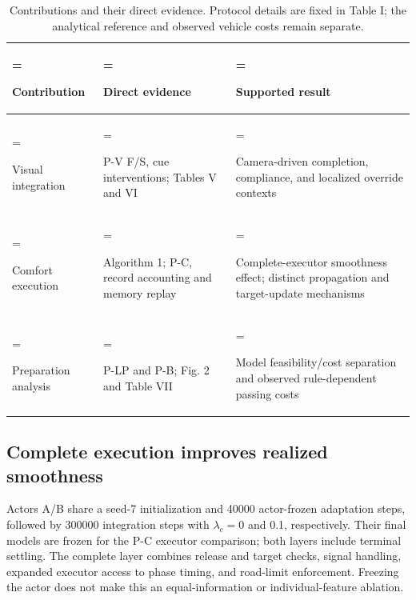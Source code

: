 \documentclass[letterpaper,journal]{IEEEtran}
\begin{document}
\begin{table}[!t]
\centering
\renewcommand{\thetable}{II}
\caption{Contributions and their direct evidence. Protocol details are fixed in Table I; the analytical reference and observed vehicle costs remain separate.}
\setlength{\tabcolsep}{3pt}
\renewcommand{\arraystretch}{1.12}
\begin{tabularx}{\textwidth}{@{}>{\hsize=0.600000\hsize\linewidth=\hsize\raggedright\arraybackslash}X>{\hsize=1.020000\hsize\linewidth=\hsize\raggedright\arraybackslash}X>{\hsize=1.380000\hsize\linewidth=\hsize\raggedright\arraybackslash}X@{}}
\toprule
\textbf{Contribution} & \textbf{Direct evidence} & \textbf{Supported result} \\
\midrule
Visual integration & P-V F/S, cue interventions; Tables V and VI & Camera-driven completion, compliance, and localized override contexts \\
Comfort execution & Algorithm 1; P-C, record accounting and memory replay & Complete-executor smoothness effect; distinct propagation and target-update mechanisms \\
Preparation analysis & P-LP and P-B; Fig. 2 and Table VII & Model feasibility/cost separation and observed rule-dependent passing costs \\
\bottomrule\end{tabularx}
\end{table}

\subsection{Complete execution improves realized smoothness}

Actors A/B share a seed-7 initialization and 40000 actor-frozen adaptation steps, followed by 300000 integration steps with \(\lambda_c=0\) and 0.1, respectively. Their final models are frozen for the P-C executor comparison; both layers include terminal settling. The complete layer combines release and target checks, signal handling, expanded executor access to phase timing, and road-limit enforcement. Freezing the actor does not make this an equal-information or individual-feature ablation.
\end{document}
